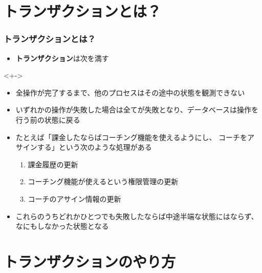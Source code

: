 \section{トランザクションとは？}

\begin{frame}
  \frametitle{トランザクションとは？}

  \pause
  \begin{itemize}
    \item<+-> \textbf{トランザクション}は次を満す
  \end{itemize}

  \begin{uncoverenv}<+->
    \begin{shadequote}[r]{}
      \begin{itemize}
        \item 全操作が完了するまで、他のプロセスはその途中の状態を観測できない
        \item いずれかの操作が失敗した場合は全てが失敗となり、データベースは操作を行う前の状態に戻る
      \end{itemize}
    \end{shadequote}
  \end{uncoverenv}

  \begin{itemize}
    \item<+-> たとえば「課金したならばコーチング機能を使えるようにし、
    コーチをアサインする」という次のような処理がある
    \begin{enumerate}
      \item 課金履歴の更新
      \item コーチング機能が使えるという権限管理の更新
      \item コーチのアサイン情報の更新
    \end{enumerate}
    
    \item<+-> これらのうちどれかひとつでも失敗したならば中途半端な状態にはならず、
    なにもしなかった状態となる
  \end{itemize}
\end{frame}

\section{トランザクションのやり方}

